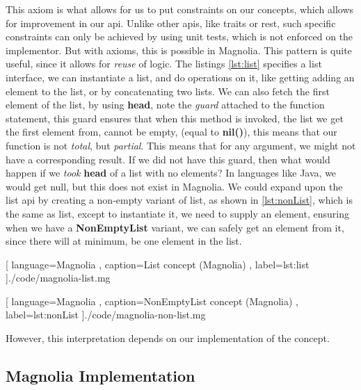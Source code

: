 This axiom is what allows for us to put constraints on our concepts, which
allows for improvement in our \gls{api}. Unlike other \gls{api}s, like traits or
\gls{rest}, such specific constraints can only be achieved by using unit tests,
which is not enforced on the implementor. But with axioms, this is possible in
Magnolia. This pattern is quite useful, since it allows for \textit{reuse} of
logic. The listings \ref{lst:list} specifies a list interface, we can
instantiate a list, and do operations on it, like getting adding an element to
the list, or by concatenating two lists. We can also fetch the first element of
the list, by using \textbf{head}, note the \textit{guard} attached to the
function statement, this guard ensures that when this method is invoked, the
list we get the first element from, cannot be empty, (equal to \textbf{nil()}),
this means that our function is not \textit{total}, but \textit{partial}. This
means that for any argument, we might not have a corresponding result. If we did
not have this guard, then what would happen if we \textit{took} \textbf{head} of a list
with no elements? In languages like Java, we would get null, but this does not
exist in Magnolia. We could expand upon the list \gls{api} by creating a
non-empty variant of list, as shown in \ref{lst:nonList}, which is the same as
list, except to instantiate it, we need to supply an element, ensuring when we
have a \textbf{NonEmptyList} variant, we can safely get an element from it,
since there will at minimum, be one element in the list.

\begin{center}
  
    [ language=Magnolia
    , caption={List concept (Magnolia)}
    , label=lst:list
    ]{./code/magnolia-list.mg}
\end{center}

\begin{center}
  
    [ language=Magnolia
    , caption={NonEmptyList concept (Magnolia)}
    , label=lst:nonList
    ]{./code/magnolia-non-list.mg}
\end{center}

However, this interpretation depends on our implementation of the concept.

\subsection{Magnolia Implementation}

